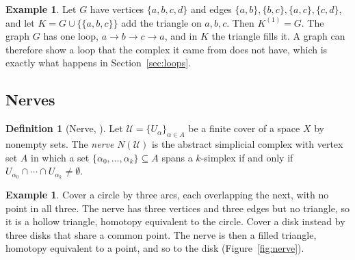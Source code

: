 \documentclass{article}
\theoremstyle{definition}
\newtheorem{definition}[theorem]{Definition}
\newtheorem{example}[theorem]{Example}
\theoremstyle{remark}
\begin{document}
\begin{example}\label{ex:graph}
Let $G$ have vertices $\{a,b,c,d\}$ and edges $\{a,b\}, \{b,c\}, \{a,c\}, \{c,d\}$, and let $K = G \cup \{\{a,b,c\}\}$ add the triangle on $a,b,c$.
Then $K^{(1)} = G$.
The graph $G$ has one loop, $a \to b \to c \to a$, and in $K$ the triangle fills it.
A graph can therefore show a loop that the complex it came from does not have, which is exactly what happens in Section~\ref{sec:loops}.
\end{example}

\subsection{Nerves}
\begin{definition}[Nerve, {\cite{singh2007mapper,hatcher2001}}]
Let $\mathcal U = \{U_\alpha\}_{\alpha \in A}$ be a finite cover of a space $X$ by nonempty sets.
The \emph{nerve} $N(\mathcal U)$ is the abstract simplicial complex with vertex set $A$ in which a set $\{\alpha_0, \dots, \alpha_k\} \subseteq A$ spans a $k$-simplex if and only if $U_{\alpha_0} \cap \cdots \cap U_{\alpha_k} \neq \emptyset$.
\end{definition}

\begin{example}\label{ex:nerve}
Cover a circle by three arcs, each overlapping the next, with no point in all three.
The nerve has three vertices and three edges but no triangle, so it is a hollow triangle, homotopy equivalent to the circle.
Cover a disk instead by three disks that share a common point. The nerve is then a filled triangle, homotopy equivalent to a point, and so to the disk (Figure~\ref{fig:nerve}).
\end{example}
\end{document}
